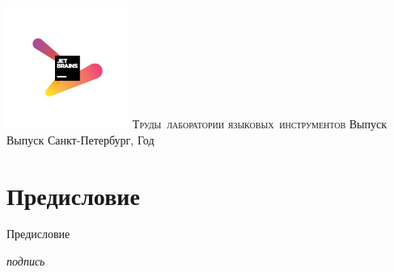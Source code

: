 \documentclass[runningheads]{jblab}
\begin{document}
\newcommand{\Issue}[0]{Выпуск}
\newcommand{\Year}[0]{Год}

\sloppy

\begin{titlepage}

\centering

\includegraphics[width=4cm]{logo_JetBrains_1.png}
\vskip 1mm
\mbox{\Large{\textsc{Труды лаборатории}}}
\vskip 0.5cm
\mbox{\Large{\textsc{языковых инструментов}}}
\vskip 2.5cm
\large{Выпуск \Issue}
\vskip 6cm
\large{Санкт-Петербург, \Year}
\end{titlepage}

\thispagestyle{empty}
\phantom{xx}
\pagebreak

\chapter*{Предисловие}

Предисловие

\vskip 2cm
\begin{flushright}
\textit{подпись}
\end{flushright}

{
\tableofcontents
\thispagestyle{plain}
}


\end{document}
